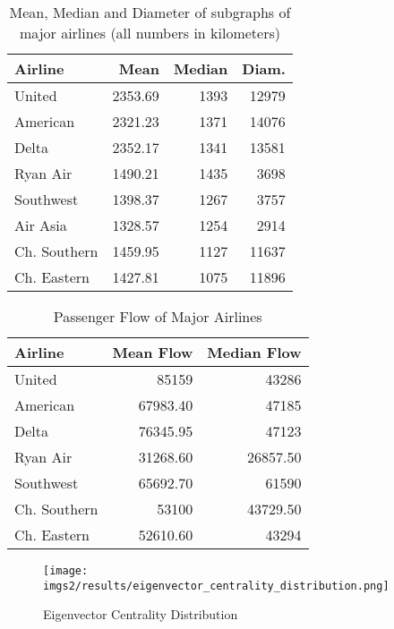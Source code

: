 \documentclass[twocolumn]{tum-article}
\begin{document}
\begin{table}[ht]
\begin{center}
 \begin{tabular}{| l | r | r | r |}
 \hline
 \textbf{Airline} & \textbf{Mean} & \textbf{Median} & \textbf{Diam.} \\ 
 \hline
 United & 2353.69 & 1393 & 12979 \\
 \hline   
 American & 2321.23 & 1371 & 14076 \\
 \hline   
 Delta & 2352.17 & 1341 & 13581 \\
 \hline   
 Ryan Air & 1490.21 & 1435 & 3698 \\
 \hline   
 Southwest & 1398.37 & 1267 & 3757 \\
 \hline   
 Air Asia & 1328.57 & 1254 & 2914 \\
 \hline   
 Ch. Southern & 1459.95 & 1127 & 11637 \\
 \hline   
 Ch. Eastern & 1427.81 & 1075 & 11896 \\
 \hline
 \end{tabular}
\caption{Mean, Median and Diameter of subgraphs of major airlines (all numbers in kilometers)}
\label{Tab:distance_airlines}
\end{center}
\end{table}


\begin{table}[ht]
\begin{center}
 \begin{tabular}{| l | r | r |}
 \hline
 \textbf{Airline} & \textbf{Mean Flow} & \textbf{Median Flow} \\ [0.5ex]
 \hline
 United & 85159 & 43286 \\
 \hline
 American & 67983.40 & 47185 \\
 \hline
 Delta & 76345.95  & 47123 \\
 \hline
 Ryan Air & 31268.60 & 26857.50 \\
 \hline
 Southwest & 65692.70  & 61590 \\
 \hline
 Ch. Southern & 53100  & 43729.50 \\
 \hline
 Ch. Eastern & 52610.60  & 43294 \\
 \hline
 \end{tabular}
\caption{Passenger Flow of Major Airlines}
\label{Tab:passenger_flow_airlines}
\end{center}
\end{table}

\begin{figure}
        \centering
        \texttt{[image: imgs2/results/eigenvector\_centrality\_distribution.png]}
        \caption{
Eigenvector Centrality Distribution}
        \label{fig:eigen_distr}
\end{figure}
\end{document}
